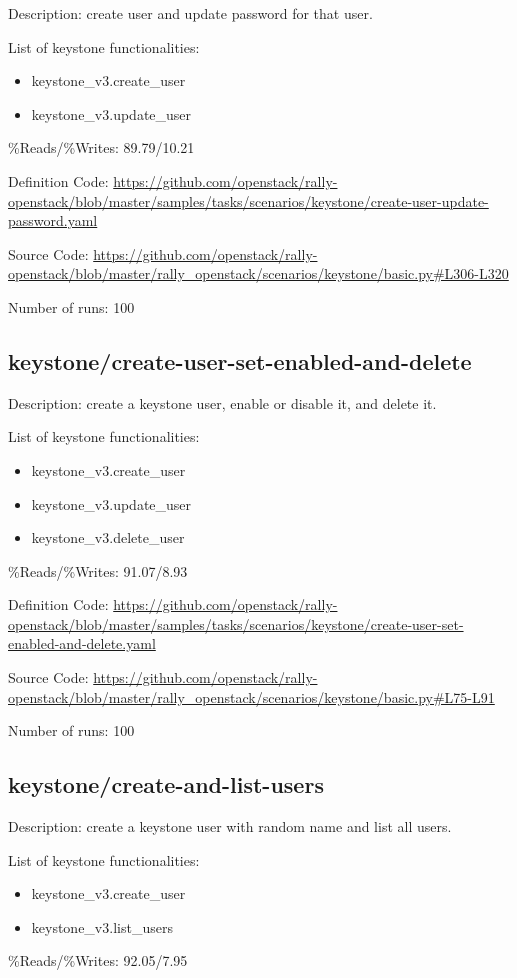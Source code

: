 Description: create user and update password for that user.

List of keystone functionalities:
\begin{itemize}
\item    keystone\_v3.create\_user
\item    keystone\_v3.update\_user
\end{itemize}
\%Reads/\%Writes: 89.79/10.21

Definition Code: \url{https://github.com/openstack/rally-openstack/blob/master/samples/tasks/scenarios/keystone/create-user-update-password.yaml}

Source Code: \url{https://github.com/openstack/rally-openstack/blob/master/rally\_openstack/scenarios/keystone/basic.py#L306-L320}

Number of runs: 100


\subsection{keystone/create-user-set-enabled-and-delete}

Description: create a keystone user, enable or disable it, and delete it.

List of keystone functionalities:
\begin{itemize}
\item    keystone\_v3.create\_user
\item    keystone\_v3.update\_user
\item    keystone\_v3.delete\_user
\end{itemize}
\%Reads/\%Writes: 91.07/8.93

Definition Code: \url{https://github.com/openstack/rally-openstack/blob/master/samples/tasks/scenarios/keystone/create-user-set-enabled-and-delete.yaml}

Source Code: \url{https://github.com/openstack/rally-openstack/blob/master/rally\_openstack/scenarios/keystone/basic.py#L75-L91}

Number of runs: 100

\subsection{keystone/create-and-list-users}

Description: create a keystone user with random name and list all users.

List of keystone functionalities:
\begin{itemize}
\item    keystone\_v3.create\_user
\item    keystone\_v3.list\_users
\end{itemize}
\%Reads/\%Writes: 92.05/7.95

